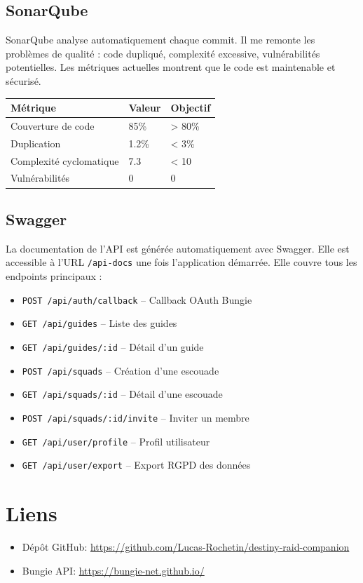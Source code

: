 \subsection{SonarQube}

SonarQube analyse automatiquement chaque commit. Il me remonte les problèmes de qualité : code dupliqué, complexité excessive, vulnérabilités potentielles. Les métriques actuelles montrent que le code est maintenable et sécurisé.

\begin{center}
\begin{tabular}{|l|l|l|}
\hline
\textbf{Métrique} & \textbf{Valeur} & \textbf{Objectif} \\
\hline
Couverture de code & 85\% & > 80\% \\
Duplication & 1.2\% & < 3\% \\
Complexité cyclomatique & 7.3 & < 10 \\
Vulnérabilités & 0 & 0 \\
\hline
\end{tabular}
\end{center}

\subsection{Swagger}

La documentation de l'API est générée automatiquement avec Swagger. Elle est accessible à l'URL \texttt{/api-docs} une fois l'application démarrée. Elle couvre tous les endpoints principaux :

\begin{itemize}
    \item \texttt{POST /api/auth/callback} – Callback OAuth Bungie
    \item \texttt{GET /api/guides} – Liste des guides
    \item \texttt{GET /api/guides/:id} – Détail d'un guide
    \item \texttt{POST /api/squads} – Création d'une escouade
    \item \texttt{GET /api/squads/:id} – Détail d'une escouade
    \item \texttt{POST /api/squads/:id/invite} – Inviter un membre
    \item \texttt{GET /api/user/profile} – Profil utilisateur
    \item \texttt{GET /api/user/export} – Export RGPD des données
\end{itemize}

\section{Liens}

\begin{itemize}
    \item Dépôt GitHub: \url{https://github.com/Lucas-Rochetin/destiny-raid-companion}
    \item Bungie API: \url{https://bungie-net.github.io/}
\end{itemize}